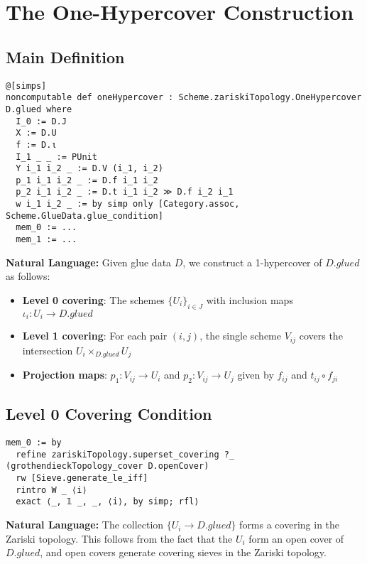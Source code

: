 \documentclass{article}
\theoremstyle{definition}
\begin{document}
\section{The One-Hypercover Construction}

\subsection{Main Definition}

\begin{lstlisting}
@[simps]
noncomputable def oneHypercover : Scheme.zariskiTopology.OneHypercover D.glued where
  I_0 := D.J
  X := D.U
  f := D.ι
  I_1 _ _ := PUnit
  Y i_1 i_2 _ := D.V (i_1, i_2)
  p_1 i_1 i_2 _ := D.f i_1 i_2
  p_2 i_1 i_2 _ := D.t i_1 i_2 ≫ D.f i_2 i_1
  w i_1 i_2 _ := by simp only [Category.assoc, Scheme.GlueData.glue_condition]
  mem_0 := ...
  mem_1 := ...
\end{lstlisting}

\textbf{Natural Language:} Given glue data $D$, we construct a 1-hypercover of $D.glued$ as follows:
\begin{itemize}
\item \textbf{Level 0 covering}: The schemes $\{U_i\}_{i \in J}$ with inclusion maps $\iota_i: U_i \to D.glued$
\item \textbf{Level 1 covering}: For each pair $(i,j)$, the single scheme $V_{ij}$ covers the intersection $U_i \times_{D.glued} U_j$
\item \textbf{Projection maps}: $p_1: V_{ij} \to U_i$ and $p_2: V_{ij} \to U_j$ given by $f_{ij}$ and $t_{ij} \circ f_{ji}$
\end{itemize}

\subsection{Level 0 Covering Condition}

\begin{lstlisting}
mem_0 := by
  refine zariskiTopology.superset_covering ?_ (grothendieckTopology_cover D.openCover)
  rw [Sieve.generate_le_iff]
  rintro W _ ⟨i⟩
  exact ⟨_, 𝟙 _, _, ⟨i⟩, by simp; rfl⟩
\end{lstlisting}

\textbf{Natural Language:} The collection $\{U_i \to D.glued\}$ forms a covering in the Zariski topology. This follows from the fact that the $U_i$ form an open cover of $D.glued$, and open covers generate covering sieves in the Zariski topology.
\end{document}

